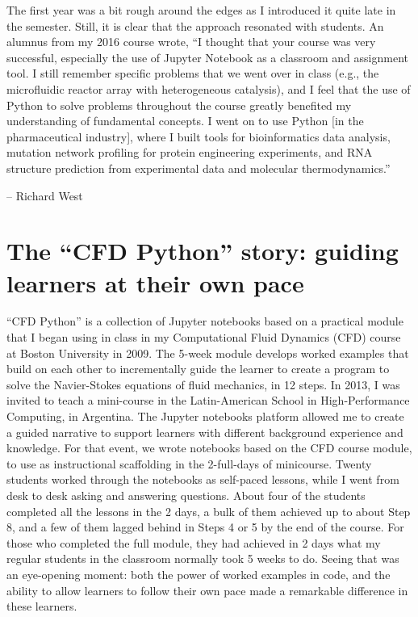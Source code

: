 \documentclass[]{book}
\begin{document}
The first year was a bit rough around the edges as I introduced it quite
late in the semester. Still, it is clear that the approach resonated
with students. An alumnus from my 2016 course wrote, ``I thought that
your course was very successful, especially the use of Jupyter Notebook
as a classroom and assignment tool. I still remember specific problems
that we went over in class (e.g., the microfluidic reactor array with
heterogeneous catalysis), and I feel that the use of Python to solve
problems throughout the course greatly benefited my understanding of
fundamental concepts. I went on to use Python {[}in the pharmaceutical
industry{]}, where I built tools for bioinformatics data analysis,
mutation network profiling for protein engineering experiments, and RNA
structure prediction from experimental data and molecular
thermodynamics.''

-- Richard West

\section{\texorpdfstring{The ``CFD Python'' story: guiding learners at
their own
pace}{The CFD Python story: guiding learners at their own pace}}\label{the-cfd-python-story-guiding-learners-at-their-own-pace}

``CFD Python'' is a collection of Jupyter notebooks based on a practical
module that I began using in class in my Computational Fluid Dynamics
(CFD) course at Boston University in 2009. The 5-week module develops
worked examples that build on each other to incrementally guide the
learner to create a program to solve the Navier-Stokes equations of
fluid mechanics, in 12 steps. In 2013, I was invited to teach a
mini-course in the Latin-American School in High-Performance Computing,
in Argentina. The Jupyter notebooks platform allowed me to create a
guided narrative to support learners with different background
experience and knowledge. For that event, we wrote notebooks based on
the CFD course module, to use as instructional scaffolding in the
2-full-days of minicourse. Twenty students worked through the notebooks
as self-paced lessons, while I went from desk to desk asking and
answering questions. About four of the students completed all the
lessons in the 2 days, a bulk of them achieved up to about Step 8, and a
few of them lagged behind in Steps 4 or 5 by the end of the course. For
those who completed the full module, they had achieved in 2 days what my
regular students in the classroom normally took 5 weeks to do. Seeing
that was an eye-opening moment: both the power of worked examples in
code, and the ability to allow learners to follow their own pace made a
remarkable difference in these learners.
\end{document}
